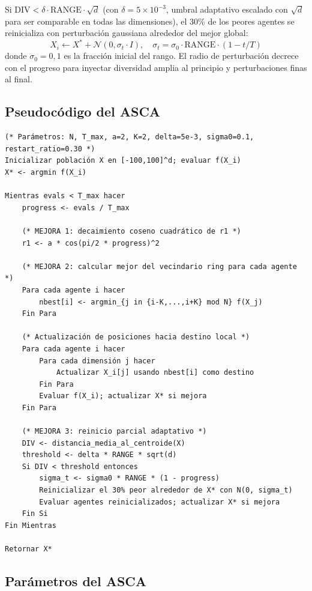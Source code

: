 \documentclass[12pt,a4paper]{article}
\begin{document}
Si $\text{DIV} < \delta \cdot \text{RANGE} \cdot \sqrt{d}$ (con $\delta = 5 \times 10^{-3}$, umbral adaptativo escalado con $\sqrt{d}$ para ser comparable en todas las dimensiones), el 30\% de los peores agentes se reinicializa con perturbación gaussiana alrededor del mejor global:
\begin{equation}
  {X}_i \leftarrow {X}^* + \mathcal{N}(0, \sigma_t \cdot {I}), \quad
  \sigma_t = \sigma_0 \cdot \text{RANGE} \cdot (1 - t/T)
  \label{eq:restart}
\end{equation}
donde $\sigma_0 = 0{,}1$ es la fracción inicial del rango. El radio de perturbación decrece con el progreso para inyectar diversidad amplia al principio y perturbaciones finas al final.
 
\subsection{Pseudocódigo del ASCA}
 
\begin{lstlisting}[caption={Pseudocódigo del ASCA}, label={lst:asca}]
(* Parámetros: N, T_max, a=2, K=2, delta=5e-3, sigma0=0.1, restart_ratio=0.30 *)
Inicializar población X en [-100,100]^d; evaluar f(X_i)
X* <- argmin f(X_i)
 
Mientras evals < T_max hacer
    progress <- evals / T_max
 
    (* MEJORA 1: decaimiento coseno cuadrático de r1 *)
    r1 <- a * cos(pi/2 * progress)^2
 
    (* MEJORA 2: calcular mejor del vecindario ring para cada agente *)
    Para cada agente i hacer
        nbest[i] <- argmin_{j in {i-K,...,i+K} mod N} f(X_j)
    Fin Para
 
    (* Actualización de posiciones hacia destino local *)
    Para cada agente i hacer
        Para cada dimensión j hacer
            Actualizar X_i[j] usando nbest[i] como destino
        Fin Para
        Evaluar f(X_i); actualizar X* si mejora
    Fin Para
 
    (* MEJORA 3: reinicio parcial adaptativo *)
    DIV <- distancia_media_al_centroide(X)
    threshold <- delta * RANGE * sqrt(d)
    Si DIV < threshold entonces
        sigma_t <- sigma0 * RANGE * (1 - progress)
        Reinicializar el 30% peor alrededor de X* con N(0, sigma_t)
        Evaluar agentes reinicializados; actualizar X* si mejora
    Fin Si
Fin Mientras
 
Retornar X*
\end{lstlisting}
 
\subsection{Parámetros del ASCA}
 
\end{document}
